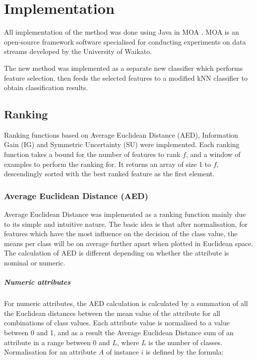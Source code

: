 \chapter{Implementation}
\label{chapter:Implementation}
All implementation of the method was done using Java in MOA \citep{Bifet:2010:MMO:1756006.1859903}. MOA is an open-source framework software specialised for conducting experiments on data streams developed by the University of Waikato.

The new method was implemented as a separate new classifier which performs feature selection, then feeds the selected features to a modified kNN classifier to obtain classification results.

\section{Ranking}
Ranking functions based on Average Euclidean Distance (AED), Information Gain (IG) and Symmetric Uncertainty (SU) were implemented. Each ranking function takes a bound for the number of features to rank $f$, and a window of examples to perform the ranking for. It returns an array of size 1 to $f$, descendingly sorted with the best ranked feature as the first element.

\subsection{Average Euclidean Distance (AED)}
Average Euclidean Distance was implemented as a ranking function mainly due to its simple and intuitive nature. The basic idea is that after normalisation, for features which have the most influence on the decision of the class value, the means per class will be on average further apart when plotted in Euclidean space. The calculation of AED is different depending on whether the attribute is nominal or numeric.

\paragraph{Numeric attributes}
For numeric attributes, the AED calculation is calculated by a summation of all the Euclidean distances between the mean value of the attribute for all combinations of class values. Each attribute value is normalised to a value between 0 and 1, and as a result the Average Euclidean Distance sum of an attribute in a range between 0 and $L$, where $L$ is the number of classes. Normalisation for an attribute $A$ of instance $i$ is defined by the formula:

